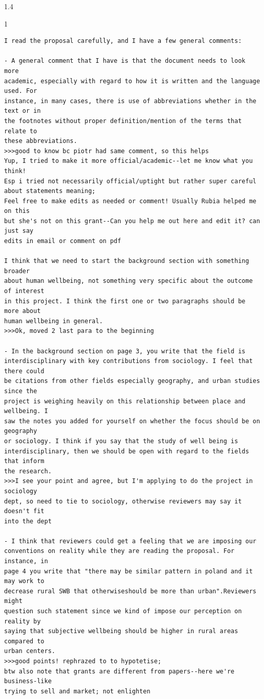 \documentclass[10pt, letterpaper]{article}
\begin{document}
\begin{spacing}{1.4}
\begin{scriptsize}
\begin{spacing}{1}
\begin{verbatim}
I read the proposal carefully, and I have a few general comments: 

- A general comment that I have is that the document needs to look more
academic, especially with regard to how it is written and the language used. For
instance, in many cases, there is use of abbreviations whether in the text or in
the footnotes without proper definition/mention of the terms that relate to
these abbreviations. 
>>>good to know bc piotr had same comment, so this helps
Yup, I tried to make it more official/academic--let me know what you think!
Esp i tried not necessarily official/uptight but rather super careful about statements meaning;
Feel free to make edits as needed or comment! Usually Rubia helped me on this
but she's not on this grant--Can you help me out here and edit it? can just say
edits in email or comment on pdf

I think that we need to start the background section with something broader
about human wellbeing, not something very specific about the outcome of interest
in this project. I think the first one or two paragraphs should be more about
human wellbeing in general. 
>>>Ok, moved 2 last para to the beginning

- In the background section on page 3, you write that the field is
interdisciplinary with key contributions from sociology. I feel that there could
be citations from other fields especially geography, and urban studies since the
project is weighing heavily on this relationship between place and wellbeing. I
saw the notes you added for yourself on whether the focus should be on geography
or sociology. I think if you say that the study of well being is
interdisciplinary, then we should be open with regard to the fields that inform
the research. 
>>>I see your point and agree, but I'm applying to do the project in sociology
dept, so need to tie to sociology, otherwise reviewers may say it doesn't fit
into the dept

- I think that reviewers could get a feeling that we are imposing our
conventions on reality while they are reading the proposal. For instance, in
page 4 you write that "there may be similar pattern in poland and it may work to
decrease rural SWB that otherwiseshould be more than urban".Reviewers might
question such statement since we kind of impose our perception on reality by
saying that subjective wellbeing should be higher in rural areas compared to
urban centers.
>>>good points! rephrazed to to hypotetise; 
btw also note that grants are different from papers--here we're business-like
trying to sell and market; not enlighten


\end{verbatim}
\end{spacing}
\end{scriptsize}
\end{spacing}
\end{document}
